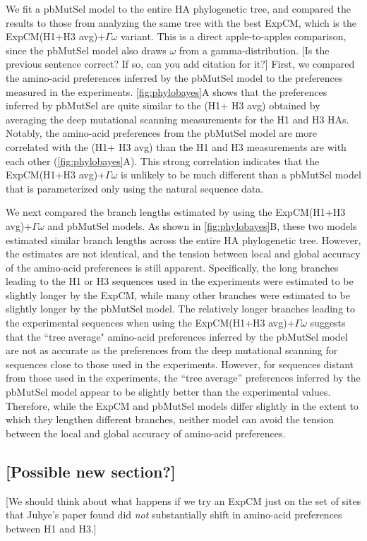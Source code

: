 \documentclass[11pt]{article}
\newcommand\jdbcomment[1]{{\color{red}[#1]}}
\begin{document}
We fit a pbMutSel model to the entire HA phylogenetic tree, and compared the results to those from analyzing the same tree with the best ExpCM, which is the ExpCM(H1+H3 avg)+$\Gamma\omega$ variant.
This is a direct apple-to-apples comparison, since the pbMutSel model also draws $\omega$ from a gamma-distribution.
\jdbcomment{Is the previous sentence correct? If so, can you add citation for it?}
First, we compared the amino-acid preferences inferred by the pbMutSel model to the preferences measured in the experiments.
\ref{fig:phylobayes}A shows that the preferences inferred by pbMutSel are quite similar to the (H1+ H3 avg) obtained by averaging the deep mutational scanning measurements for the H1 and H3 HAs. 
Notably, the amino-acid preferences from the pbMutSel model are more correlated with the (H1+ H3 avg) than the H1 and H3 measurements are with each other (\ref{fig:phylobayes}A).
This strong correlation indicates that the ExpCM(H1+H3 avg)+$\Gamma\omega$ is unlikely to be much different than a pbMutSel model that is parameterized only using the natural sequence data.  

We next compared the branch lengths estimated by using the ExpCM(H1+H3 avg)+$\Gamma\omega$ and pbMutSel models.
As shown in \ref{fig:phylobayes}B, these two models estimated similar branch lengths across the entire HA phylogenetic tree. 
However, the estimates are not identical, and the tension between local and global accuracy of the amino-acid preferences is still apparent. 
Specifically, the long branches leading to the H1 or H3 sequences used in the experiments were estimated to be slightly longer by the ExpCM, while many other branches were estimated to be slightly longer by the pbMutSel model. 
The relatively longer branches leading to the experimental sequences when using the ExpCM(H1+H3 avg)+$\Gamma\omega$ suggests that the ``tree average" amino-acid preferences inferred by the pbMutSel model are not as accurate as the preferences from the deep mutational scanning for sequences close to those used in the experiments. 
However, for sequences distant from those used in the experiments, the ``tree average'' preferences inferred by the pbMutSel model appear to be slightly better than the experimental values.
Therefore, while the ExpCM and pbMutSel models differ slightly in the extent to which they lengthen different branches, neither model can avoid the tension between the local and global accuracy of amino-acid preferences. 

\subsection*{\jdbcomment{Possible new section?}}
\jdbcomment{We should think about what happens if we try an ExpCM just on the set of sites that Juhye's paper found did \emph{not} substantially shift in amino-acid preferences between H1 and H3.}
\end{document}
